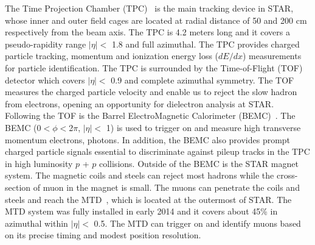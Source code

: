 The Time Projection Chamber (TPC)~\cite{TPCdet} is the main tracking device in STAR, whose inner and outer field cages are located at radial distance of 50 and 200 cm respectively from the beam axis. The TPC is 4.2 meters long and it covers a pseudo-rapidity range $|\eta|<$ 1.8 and full azimuthal. The TPC provides charged particle tracking, momentum and ionization energy loss ($dE/dx$) measurements for particle identification. The TPC is surrounded by the Time-of-Flight (TOF)~\cite{TOFdet} detector which covers $|\eta|<$ 0.9 and complete azimuthal symmetry. The TOF measures the charged particle velocity and enable us to reject the slow hadron from electrons, opening an opportunity for dielectron analysis at STAR. Following the TOF is the Barrel ElectroMagnetic Calorimeter (BEMC)~\cite{BEMCdet}. The BEMC (0$<\phi<$2$\pi$, $|\eta|<$ 1) is used to trigger on and measure high transverse momentum electrons, photons. In addition, the BEMC also provides prompt charged particle signals essential to discriminate against pileup tracks in the TPC in high luminosity $p$ + $p$ collisions. Outside of the BEMC is the STAR magnet system. The magnetic coils and steels can reject most hadrons while the cross-section of muon in the magnet is small. The muons can penetrate the coils and steels and reach the MTD~\cite{MTDdet}, which is located at the outermost of STAR. The MTD system was fully installed in early 2014 and it covers about 45\% in azimuthal within $|\eta|<$ 0.5. The MTD can trigger on and identify muons based on its precise timing and modest position resolution.

